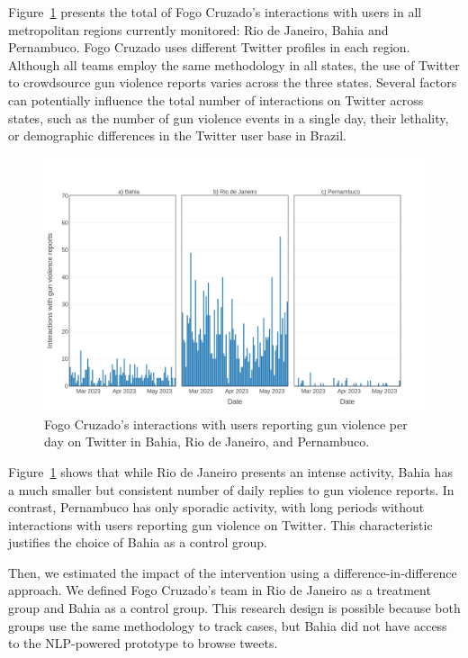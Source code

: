 \documentclass[11pt,letterpaper]{article}
\begin{document}
Figure~\ref{fig:interactions} presents the total of Fogo Cruzado's interactions with users in all metropolitan regions currently monitored: Rio de Janeiro, Bahia and Pernambuco. Fogo Cruzado uses different Twitter profiles in each region. Although all teams employ the same methodology in all states, the use of Twitter to crowdsource gun violence reports varies across the three states. Several factors can potentially influence the total number of interactions on Twitter across states, such as the number of gun violence events in a single day, their lethality, or demographic differences in the Twitter user base in Brazil. 

\begin{figure}[H]
    \centering
    \includegraphics[width=0.8\linewidth]{figs/interactions_per_day_uf.png}
    \caption{Fogo Cruzado's interactions with users reporting gun violence per day on Twitter in Bahia, Rio de Janeiro, and Pernambuco.}
    \label{fig:interactions}
\end{figure}

Figure~\ref{fig:interactions} shows that while Rio de Janeiro presents an intense activity, Bahia has a much smaller but consistent number of daily replies to gun violence reports. In contrast, Pernambuco has only sporadic activity, with long periods without interactions with users reporting gun violence on Twitter. This characteristic justifies the choice of Bahia as a control group. 

Then, we estimated the impact of the intervention using a difference-in-difference approach. We defined Fogo Cruzado's team in Rio de Janeiro as a treatment group and Bahia as a control group. This research design is possible because both groups use the same methodology to track cases, but Bahia did not have access to the NLP-powered prototype to browse tweets. 
\end{document}
